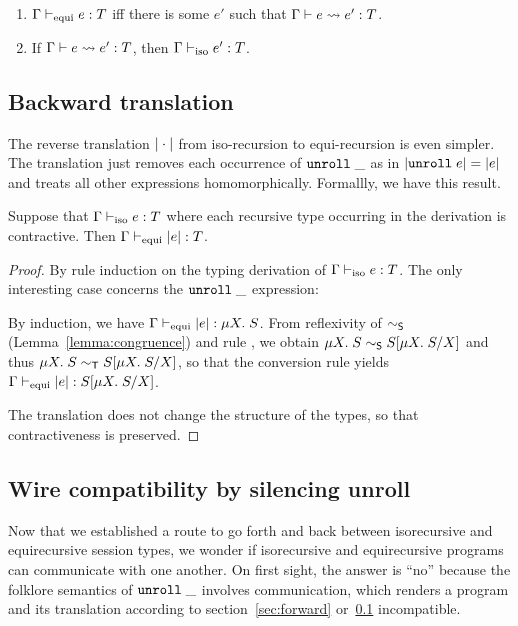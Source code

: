 \begin{lemma}
  \begin{enumerate}
  \item $\typing{\tyEqui e} T$ iff there is some $e'$ such that
    $\translation e {e'} T$.
  \item If $\translation e {e'} T$, then $\typing{\tyIso e'} T$.
  \end{enumerate}
\end{lemma}

\subsection{Backward translation}
\label{sec:backward-translation}

The reverse translation $\IsoToEqui\cdot$ from iso-recursion to equi-recursion is even
simpler. The translation just removes each occurrence of $\EUnroll\_$
as in $\IsoToEqui{\EUnroll e} = \IsoToEqui e$ and treats all other
expressions homomorphically. Formallly, we have this result.
\begin{lemma}
  Suppose that $\typing{\tyIso e}T$ where each recursive type
  occurring in the derivation is contractive.
  Then $\typing{\tyEqui \IsoToEqui{e}}T$.
\end{lemma}
\begin{proof}
  By rule induction on the typing derivation of  $\typing{\tyIso
    e}T$. The only interesting case concerns the $\EUnroll\_$
  expression:
  \begin{mathpar}
  \end{mathpar}
  By induction, we have $\typing{\tyEqui \IsoToEqui{e}}{\TRec S}$.
  From reflexivity of $\eqs$ (Lemma~\ref{lemma:congruence}) and rule
  {\EqUnrollL}, we obtain $\TRec S 
  \eqs S[\TRec[X] S / X]$ and thus  $\TRec S 
  \eqt S[\TRec[X] S / X]$, so that the conversion rule yields
  $\typing{\tyEqui \IsoToEqui{e}}{S[\TRec[X] S / X]}$.

  The translation does not change the structure of the types, so that
  contractiveness is preserved.
\end{proof}

\subsection{Wire compatibility by silencing unroll}
\label{sec:wire-compatibility}

Now that we established a route to go forth and back between
isorecursive and equirecursive session types, we wonder if
isorecursive and equirecursive programs can communicate with one
another. On first sight, the answer is ``no'' because the folklore
semantics of $\EUnroll\_$ involves communication, which renders a
program and its translation according to section~\ref{sec:forward}
or~\ref{sec:backward-translation} incompatible.

